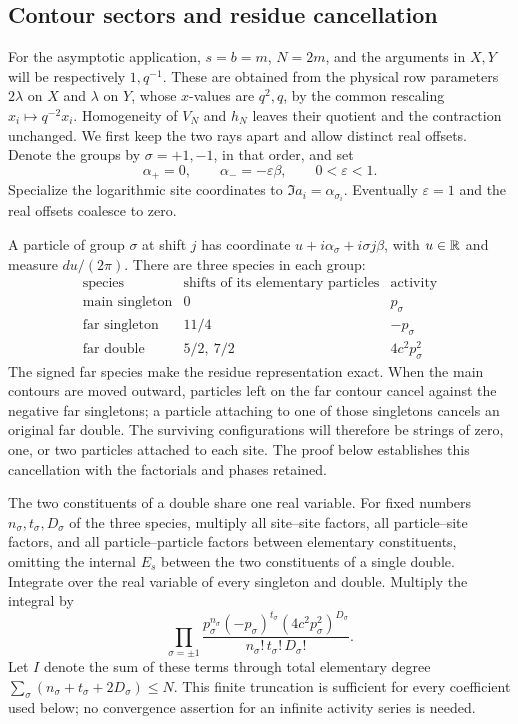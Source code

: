 \subsection{Contour sectors and residue cancellation}

For the asymptotic application, $s=b=m$, $N=2m$, and the arguments
in $X,Y$ will be respectively $1,q^{-1}$. These are obtained from the
physical row parameters $2\lambda$ on $X$ and $\lambda$ on $Y$, whose
$x$-values are $q^2,q$, by the common rescaling $x_i\mapsto q^{-2}x_i$.
Homogeneity of $V_N$ and $h_N$ leaves their quotient and the contraction
unchanged. We first keep the two rays apart and allow distinct real
offsets. Denote the groups by
$\sigma=+1,-1$, in that order, and set
\[
 \alpha_+=0,\qquad \alpha_-=-\varepsilon\beta,\qquad
 0<\varepsilon<1.
\]
Specialize the logarithmic site coordinates to
$\Im a_i=\alpha_{\sigma_i}$. Eventually $\varepsilon=1$ and the real offsets coalesce to zero.

A particle of group $\sigma$ at shift $j$ has coordinate
$u+i\alpha_\sigma+i\sigma j\beta$, with $u\in\mathbb R$ and measure
$du/(2\pi)$. There are three species in each group:
\[
\begin{array}{c|c|c}
 \text{species}&\text{shifts of its elementary particles}&\text{activity}\\\hline
 \text{main singleton}&0&p_\sigma\\
 \text{far singleton}&11/4&-p_\sigma\\
 \text{far double}&5/2,\ 7/2&4c^2p_\sigma^2
\end{array}
\]
The signed far species make the residue representation exact. When the
main contours are moved outward, particles left on the far contour
cancel against the negative far singletons; a particle attaching to
one of those singletons cancels an original far double. The surviving
configurations will therefore be strings of zero, one, or two particles
attached to each site. The proof below establishes this cancellation
with the factorials and phases retained.

The two constituents of a double share one real variable. For fixed
numbers $n_\sigma,t_\sigma,D_\sigma$ of the three species, multiply
all site--site factors, all particle--site factors, and all
particle--particle factors between elementary constituents, omitting
the internal $E_s$ between the two constituents of a single double.
Integrate over the real variable of every singleton and double.
Multiply the integral by
\[
 \prod_{\sigma=\pm1}
 \frac{p_\sigma^{n_\sigma}(-p_\sigma)^{t_\sigma}
                   (4c^2p_\sigma^2)^{D_\sigma}}
      {n_\sigma!\,t_\sigma!\,D_\sigma!}.
\]
Let $I$ denote the sum of these terms through total elementary degree
$\sum_\sigma(n_\sigma+t_\sigma+2D_\sigma)\le N$. This finite
truncation is sufficient for every coefficient used below; no
convergence assertion for an infinite activity series is needed.

